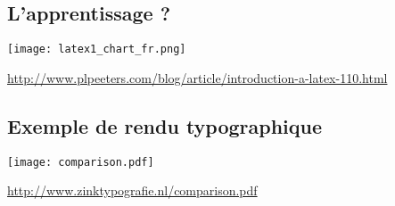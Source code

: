 \subsection{L'apprentissage ?}

\begin{slide}
	\centering \texttt{[image: latex1\_chart\_fr.png]}

	\url{http://www.plpeeters.com/blog/article/introduction-a-latex-110.html}
\end{slide}

\subsection{Exemple de rendu typographique}
\begin{slide}
  \centering
  \texttt{[image: comparison.pdf]}
  
  \url{http://www.zinktypografie.nl/comparison.pdf}
\end{slide}
